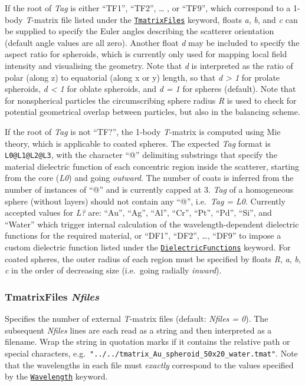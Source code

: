 \documentclass[
]{article}
\begin{document}
If the root of \emph{Tag} is either ``TF1'', ``TF2'', \ldots{} , or
``TF9'', which correspond to a 1-body \emph{T}-matrix file listed under
the \protect\hyperlink{TmatrixFiles}{\texttt{TmatrixFiles}} keyword,
floats \emph{a}, \emph{b}, and \emph{c} can be supplied to specify the
Euler angles describing the scatterer orientation (default angle values
are all zero). Another float \emph{d} may be included to specify the
aspect ratio for spheroids, which is currently only used for mapping
local field intensity and visualising the geometry. Note that \emph{d}
is interpreted as the ratio of polar (along z) to equatorial (along x or
y) length, so that \emph{d \textgreater{} 1} for prolate spheroids,
\emph{d \textless{} 1} for oblate spheroids, and \emph{d = 1} for
spheres (default). Note that for nonspherical particles the
circumscribing sphere radius \emph{R} is used to check for potential
geometrical overlap between particles, but also in the balancing scheme.

If the root of \emph{Tag} is not ``TF?'', the 1-body \emph{T}-matrix is
computed using Mie theory, which is applicable to coated spheres. The
expected \emph{Tag} format is \texttt{L0@L1@L2@L3}, with the character
``@'' delimiting substrings that specify the material dielectric
function of each concentric region inside the scatterer, starting from
the core (\emph{L0}) and going \emph{outward}. The number of coats is
inferred from the number of instances of ``@'' and is currently capped
at 3. \emph{Tag} of a homogeneous sphere (without layers) should not
contain any ``@'', i.e.~\emph{Tag = L0}. Currently accepted values for
\emph{L?} are: ``Au'', ``Ag'', ``Al'', ``Cr'', ``Pt'', ``Pd'', ``Si'',
and ``Water'' which trigger internal calculation of the
wavelength-dependent dielectric functions for the required material, or
``DF1'', ``DF2'', \ldots, ``DF9'' to impose a custom dielectric function
listed under the
\protect\hyperlink{dielectricfunctions-nfuns-1}{\texttt{DielectricFunctions}}
keyword. For coated spheres, the outer radius of each region must be
specified by floats \emph{R}, \emph{a}, \emph{b}, \emph{c} in the order
of decreasing size (i.e.~going radially \emph{inward}).

\hypertarget{tmatrixfiles-nfiles}{%
\subsubsection{\texorpdfstring{TmatrixFiles
\emph{Nfiles}}{TmatrixFiles Nfiles}}\label{tmatrixfiles-nfiles}}

Specifies the number of external \emph{T}-matrix files (default:
\emph{Nfiles = 0}). The subsequent \emph{Nfiles} lines are each read as
a string and then interpreted as a filename. Wrap the string in
quotation marks if it contains the relative path or special characters,
e.g.~\texttt{"../../tmatrix\_Au\_spheroid\_50x20\_water.tmat"}. Note
that the wavelengths in each file must \emph{exactly} correspond to the
values specified by the
\protect\hyperlink{wavelength-l1-l2-n-}{\texttt{Wavelength}} keyword.
\end{document}
